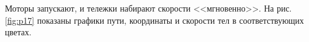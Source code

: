 \documentclass[main.tex]{subfiles}
\begin{document}










Моторы запускают, и тележки набирают скорости <<мгновенно>>. На рис.\,\ref{fig:p17} показаны графики пути, координаты и скорости тел в соответствующих цветах.
\end{document}
